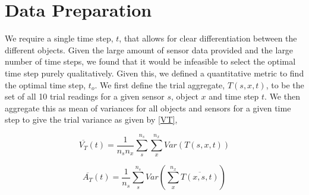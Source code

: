 \section{Data Preparation}

We require a single time step, $t$, that allows for clear differentiation between the different objects. Given the large amount of sensor data provided and the large number of time steps, we found that it would be infeasible to select the optimal time step purely qualitatively. Given this, we defined a quantitative metric to find the optimal time step, $t_o$. We first define the trial aggregate, $T\left(s, x, t\right)$, to be the set of all 10 trial readings for a given sensor $s$, object $x$ and time step $t$. We then aggregate this as mean of variances for all objects and sensors for a given time step to give the trial variance as given by \autoref{VT},

\begin{equation}
    \overline{V_T}(t) = \frac{1}{n_sn_x}\sum_{s}^{n_s} \sum_{x}^{n_x} Var\left(T\left(s, x, t\right)\right)
    \label{VT}
\end{equation}

\begin{equation}
    \overline{A_T}(t) = \frac{1}{n_s}\sum_{s}^{n_s} Var\left(\sum_{x}^{n_x} \overline{T\left(x, s, t\right)}\right)
    \label{AA}
\end{equation}

